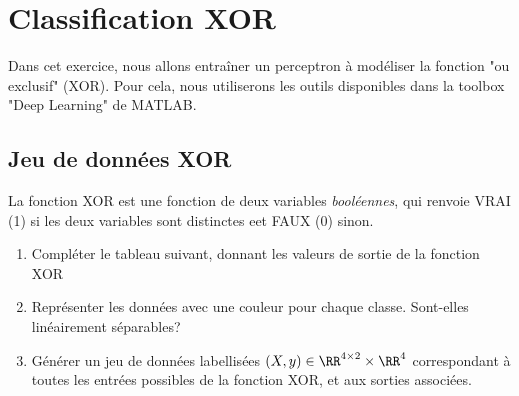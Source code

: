 \section{Classification XOR}

Dans cet exercice, nous allons entraîner un perceptron à modéliser la fonction "ou exclusif" (XOR). Pour cela, nous utiliserons les outils disponibles dans la toolbox "Deep Learning" de MATLAB.

\subsection{Jeu de données XOR}
La fonction XOR est une fonction de deux variables \emph{booléennes}, qui renvoie VRAI (1) si les deux variables sont distinctes eet FAUX (0) sinon.

\begin{enumerate}
	\item Compléter le tableau suivant, donnant les valeurs de sortie de la fonction XOR
	
	\item Représenter les données avec une couleur pour chaque classe. Sont-elles linéairement séparables?
	
	\item Générer un jeu de données labellisées $(X,y) \in \RR^{4\times 2} \times \RR^4$ correspondant à toutes les entrées possibles de la fonction XOR, et aux sorties associées.
	
\end{enumerate}
	
